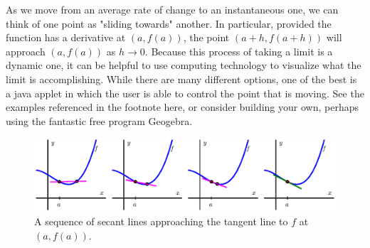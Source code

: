 As we move from an average rate of change to an instantaneous one, we can think of one point as "sliding towards" another.  In particular, provided the function has a derivative at $(a,f(a))$, the point $(a+h,f(a+h))$ will approach $(a,f(a))$ as $h \to 0$.  Because this process of taking a limit is a dynamic one, it can be helpful to use computing technology to visualize what the limit is accomplishing.  While there are many different options, one of the best is a java applet in which the user is able to control the point that is moving.   See the examples referenced in the footnote here, or consider building your own, perhaps using the fantastic free program Geogebra.

\begin{figure} %
\begin{center}
\includegraphics{figures/1_3_SecToTanSeq.eps} %
\caption{A sequence of secant lines approaching the tangent line to $f$ at $(a,f(a))$.} \label{fig:2.1.SeqToTanSeq}
\end{center}
\end{figure}

